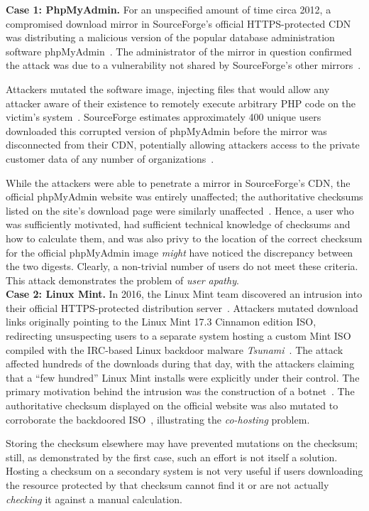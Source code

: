 \noindent\textbf{Case 1: PhpMyAdmin.} For an unspecified amount of time circa
2012, a compromised download mirror in SourceForge's official HTTPS-protected
CDN was distributing a malicious version of the popular database administration
software phpMyAdmin~\cite{SCA-PMA3}. The administrator of the mirror in question
confirmed the attack was due to a vulnerability not shared by SourceForge's
other mirrors~\cite{SCA-PMA2}.

Attackers mutated the software image, injecting files that would allow any
attacker aware of their existence to remotely execute arbitrary PHP code on the
victim's system~\cite{SCA-PMA1}. SourceForge estimates approximately 400 unique
users downloaded this corrupted version of phpMyAdmin before the mirror was
disconnected from their CDN, potentially allowing attackers access to the
private customer data of any number of organizations~\cite{SCA-PMA2}.

While the attackers were able to penetrate a mirror in SourceForge's CDN, the
official phpMyAdmin website was entirely unaffected; the authoritative checksums
listed on the site's download page were similarly unaffected~\cite{SCA-PMA2}.
Hence, a user who was sufficiently motivated, had sufficient technical knowledge
of checksums and how to calculate them, and was also privy to the location of
the correct checksum for the official phpMyAdmin image \emph{might} have noticed
the discrepancy between the two digests. Clearly, a non-trivial number of users
do not meet these criteria. This attack demonstrates the problem of \emph{user
apathy}.\\

\noindent\textbf{Case 2: Linux Mint.} In 2016, the Linux Mint team discovered an
intrusion into their official HTTPS-protected distribution
server~\cite{SCA-MINT1}. Attackers mutated download links originally pointing to
the Linux Mint 17.3 Cinnamon edition ISO, redirecting unsuspecting users to a
separate system hosting a custom Mint ISO compiled with the IRC-based Linux
backdoor malware \emph{Tsunami}~\cite{SCA-MINT2}. The attack affected hundreds
of the downloads during that day, with the attackers claiming that a ``few
hundred'' Linux Mint installs were explicitly under their control. The primary
motivation behind the intrusion was the construction of a
botnet~\cite{SCA-MINT3}. The authoritative checksum displayed on the official
website was also mutated to corroborate the backdoored ISO~\cite{SCA-MINT3},
illustrating the \emph{co-hosting} problem.

Storing the checksum elsewhere may have prevented mutations on the checksum;
still, as demonstrated by the first case, such an effort is not itself a
solution. Hosting a checksum on a secondary system is not very useful if users
downloading the resource protected by that checksum cannot find it or are not
actually \emph{checking} it against a manual calculation. \\

